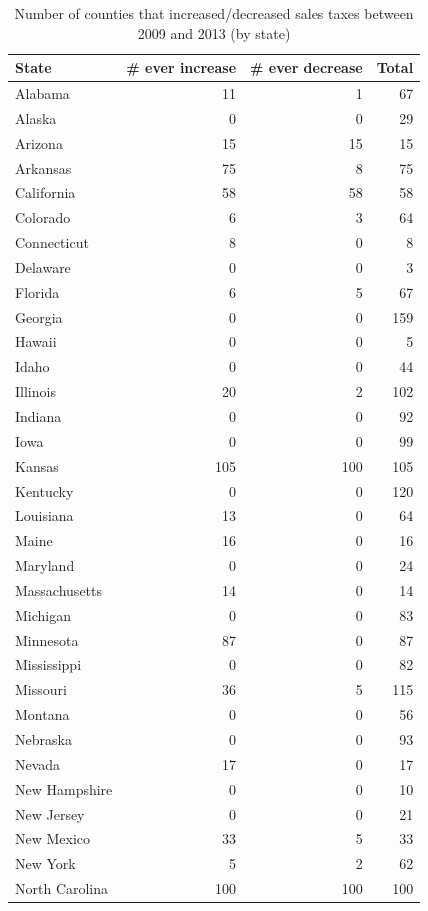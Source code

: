 \documentclass[]{article}
\begin{document}
\begin{table}

\caption{\label{tab:table_state_changes}Number of counties that increased/decreased sales taxes between 2009 and 2013 (by state)}
\centering
\begin{tabular}[t]{lrrr}
\toprule
State & \# ever increase & \# ever decrease & Total\\
\midrule
Alabama & 11 & 1 & 67\\
Alaska & 0 & 0 & 29\\
Arizona & 15 & 15 & 15\\
Arkansas & 75 & 8 & 75\\
California & 58 & 58 & 58\\
\addlinespace
Colorado & 6 & 3 & 64\\
Connecticut & 8 & 0 & 8\\
Delaware & 0 & 0 & 3\\
Florida & 6 & 5 & 67\\
Georgia & 0 & 0 & 159\\
\addlinespace
Hawaii & 0 & 0 & 5\\
Idaho & 0 & 0 & 44\\
Illinois & 20 & 2 & 102\\
Indiana & 0 & 0 & 92\\
Iowa & 0 & 0 & 99\\
\addlinespace
Kansas & 105 & 100 & 105\\
Kentucky & 0 & 0 & 120\\
Louisiana & 13 & 0 & 64\\
Maine & 16 & 0 & 16\\
Maryland & 0 & 0 & 24\\
\addlinespace
Massachusetts & 14 & 0 & 14\\
Michigan & 0 & 0 & 83\\
Minnesota & 87 & 0 & 87\\
Mississippi & 0 & 0 & 82\\
Missouri & 36 & 5 & 115\\
\addlinespace
Montana & 0 & 0 & 56\\
Nebraska & 0 & 0 & 93\\
Nevada & 17 & 0 & 17\\
New Hampshire & 0 & 0 & 10\\
New Jersey & 0 & 0 & 21\\
\addlinespace
New Mexico & 33 & 5 & 33\\
New York & 5 & 2 & 62\\
North Carolina & 100 & 100 & 100\\

\end{tabular}
\end{table}
\end{document}
